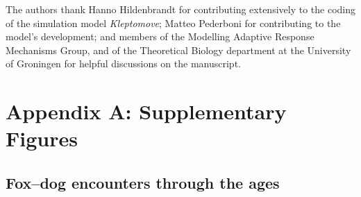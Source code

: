 \documentclass[11pt]{article}
\begin{document}
The authors thank Hanno Hildenbrandt for contributing extensively to the coding of the simulation model \textit{Kleptomove};
Matteo Pederboni for contributing to the model's development; 
and members of the Modelling Adaptive Response Mechanisms Group, and of the Theoretical Biology department at the University of Groningen for helpful discussions on the manuscript.



\newpage{}

\section{Appendix A: Supplementary Figures}

%
%
%
%
%

\renewcommand{\theequation}{A\arabic{equation}}
\renewcommand{\thetable}{A\arabic{table}}
\setcounter{equation}{0}  %
\setcounter{figure}{0}
\setcounter{table}{0}

\subsection{Fox--dog encounters through the ages}
\end{document}
